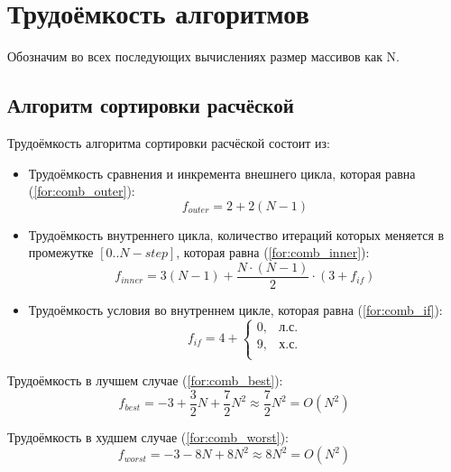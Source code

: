 \section{Трудоёмкость алгоритмов}

Обозначим во всех последующих вычислениях размер массивов как N.

\subsection{Алгоритм сортировки расчёской}

Трудоёмкость алгоритма сортировки расчёской состоит из:
\begin{itemize}
    \item Трудоёмкость сравнения и инкремента внешнего цикла, которая равна (\ref{for:comb_outer}):
        \begin{equation}
            \label{for:comb_outer}
            f_{outer} = 2 + 2(N - 1)
        \end{equation}
    \item Трудоёмкость внутреннего цикла, количество итераций которых меняется в промежутке $[0..N-step]$, которая равна (\ref{for:comb_inner}):
        \begin{equation}
            \label{for:comb_inner}
            f_{inner} = 3(N - 1) + \frac{N \cdot (N - 1)}{2} \cdot (3 + f_{if})
        \end{equation}
    \item Трудоёмкость условия во внутреннем цикле, которая равна (\ref{for:comb_if}):
        \begin{equation}
            \label{for:comb_if}
            f_{if} = 4 + \begin{cases}
                0, & \text{л.с.}\\
                9, & \text{х.с.}\\
            \end{cases}
        \end{equation}
\end{itemize}

Трудоёмкость в лучшем случае (\ref{for:comb_best}):
\begin{equation}
    \label{for:comb_best}
    f_{best} = -3 + \frac{3}{2} N + \frac{7}{2} N^2 \approx \frac{7}{2} N^2 = O(N^2)
\end{equation}

Трудоёмкость в худшем случае (\ref{for:comb_worst}):
\begin{equation}
    \label{for:comb_worst}
    f_{worst} = -3 - 8N + 8N^2 \approx 8N^2 = O(N^2)
\end{equation}

